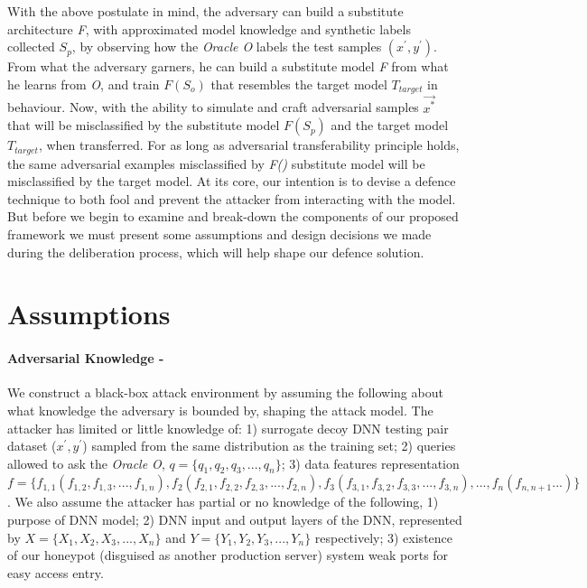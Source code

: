 \documentclass[grad,lot,lof,11pt,oneside,onehalfspace]{RUthesis}
\begin{document}
With  the  above  postulate  in  mind,  the  adversary  can  build  a  substitute  architecture \textit{F},
with approximated model knowledge and synthetic labels collected $S_{p}$, by observing how the \textit{Oracle O}
labels the test samples \textit{$(x^{'},y^{'})$}. From what the adversary garners, he can build a substitute model \textit{F} from what he learns from \textit{O}, 
and train \textit{$F(S_{o})$} that resembles the target model \textit{$T_{target}$} in behaviour.  Now, with the ability to simulate and craft adversarial samples \textit{$\vec{x^{*}}$} that will be misclassified by the substitute model \textit{$F(S_{p})$} and the target model \textit{$T_{target}$}, when transferred. For as long as adversarial transferability principle holds, the same adversarial examples misclassified by \textit{F()} substitute model will be misclassified by the target model. At its core, our intention is to devise a defence technique to both fool and prevent the
attacker from interacting with the model.  But before we begin to examine and break-down  the  components  of  our  proposed  framework  we  must  present  some  assumptions and design decisions we made during the deliberation process, which will help shape our defence solution.
\section{Assumptions}
\paragraph{Adversarial Knowledge -} We construct a black-box attack environment by assuming the following about what knowledge the adversary is bounded by, shaping the attack model. The attacker has limited or little knowledge of: 1) surrogate decoy DNN testing pair dataset ($x^{'},y^{'}$) sampled from the same distribution as the training set; 2) queries allowed to ask the \textit{Oracle O}, $q = \{q_{1}, q_{2}, q_{3},..., q_{n}\}$; 3) data features representation $f = \{f_{1,1}(f_{1,2},f_{1,3},...,f_{1,n}), f_{2}(f_{2,1}, f_{2,2},f_{2,3},...,f_{2,n}), f_{3}(f_{3,1},f_{3,2},f_{3,3},...,f_{3,n}),..., f_{n}(f_{n,n+1}...)\}$. We also assume the attacker has partial or no knowledge of the following, 1) purpose of DNN model; 2) DNN input and output layers of the DNN, represented by $X = \{X_{1},X_{2},X_{3},...,X_{n}\}$ and $Y = \{Y_{1},Y_{2},Y_{3},...,Y_{n}\}$ respectively; 3) existence of our honeypot (disguised as another production server) system weak ports for easy access entry. 
\end{document}
